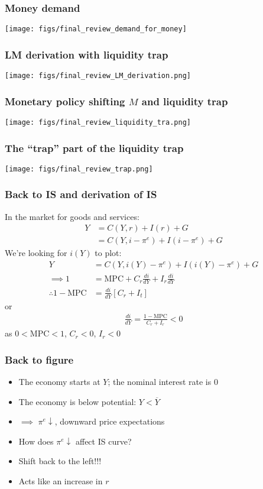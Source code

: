 \documentclass[presentation,dvipsnames]{beamer}
\begin{document}
\begin{frame}
\frametitle{Money demand}
\centerline{\texttt{[image: figs/final\_review\_demand\_for\_money]}}
\end{frame}

\begin{frame}
\frametitle{LM derivation with liquidity trap}
\centerline{\texttt{[image: figs/final\_review\_LM\_derivation.png]}}
\end{frame}

\begin{frame}
\frametitle{Monetary policy shifting $M$ and liquidity trap}
\centerline{\texttt{[image: figs/final\_review\_liquidity\_tra.png]}}
\end{frame}

\begin{frame}
\frametitle{The ``trap'' part of the liquidity trap}
\centerline{\texttt{[image: figs/final\_review\_trap.png]}}
\end{frame}

\begin{frame}
\frametitle{Back to IS and derivation of IS}
In the market for goods and services:
\begin{align*}
Y &= C(Y,r) + I(r) + G \\
&= C(Y,i - \pi^{e}) + I(i - \pi^{e}) + G
\end{align*}
We're looking for $i(Y)$ to plot:
\begin{align*}
Y &= C(Y,i(Y) - \pi^{e}) + I(i(Y) - \pi^{e}) + G \\
\implies 1 &= \text{MPC} + C_{r}\frac{di}{dY} + I_{r} \frac{di}{dY} \\
\therefore 1 - \text{MPC} &= \frac{di}{dY} \left[ C_{r} + I_{t} \right]
\end{align*}
or
\begin{align*}
\frac{di}{dY} = \frac{1-\text{MPC}}{C_{r} + I_{r}} <0
\end{align*}
as $0< \text{MPC} < 1$, $C_{r} < 0$, $I_{r} < 0$
\end{frame}

\begin{frame}
\frametitle{Back to figure}
\begin{itemize}[label={--}]
\item The economy starts at $Y$; the nominal interest rate is $0$
\item The economy is below potential: $Y < \overline{Y}$
\item $\implies$ $\pi^{e} \downarrow$, downward price expectations
\item How does $\pi^{e} \downarrow$ affect IS curve?
\item Shift back to the left!!!
\item Acts like an increase in $r$
\end{itemize}
\end{frame}
\end{document}
